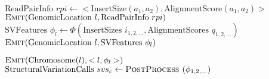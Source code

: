 \documentclass[10pt]{bmc_article}
\newenvironment{bmcformat}{\fussy\setboolean{publ}{true}}{\fussy}
\begin{document}
\begin{bmcformat}
\begin{algorithmic}[1]
    \State $ \textrm{ReadPairInfo }rpi \gets <\textrm{InsertSize}(a_1,a_2), \textrm{AlignmentScore}(a_1,a_2)>$
    \State $\textsc{Emit}(\textrm{GenomicLocation }l, \textrm{ReadPairInfo }rpi)$
    \EndFor
    \EndFor
    \EndFunction
    \State $\textrm{SVFeatures } \phi_l \gets \Phi(\textrm{InsertSizes }i_{1,2,\ldots}, \textrm{AlignmentScores }q_{1,2,\ldots})$
    \State $\textsc{Emit}(\textrm{GenomicLocation }l, \textrm{SVFeatures } \phi_l)$
    \EndFunction
    \EndProcedure

    \State $\textsc{Emit}(\textrm{Chromosome}(l), <l,\phi_l>)$
    \EndFunction
    \State $\textrm{StructuralVariationCalls } svs_c \gets \textsc{PostProcess }(\phi_{1,2,\ldots})$
    \EndFunction
    \EndProcedure
  \end{algorithmic}



\end{bmcformat}
\end{document}
